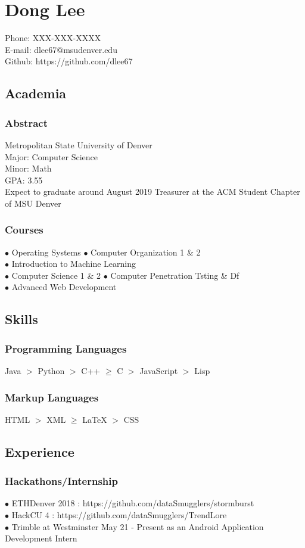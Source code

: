 \documentclass{article}
\begin{document}
\section{Dong Lee}
{\Large Phone: XXX-XXX-XXXX} \\
{\Large E-mail: dlee67@msudenver.edu} \\
{\Large Github: https://github.com/dlee67}
\subsection{Academia}
\subsubsection {Abstract}
{\Large Metropolitan State University of Denver} \\
{\Large Major: Computer Science} \\
{\Large Minor: Math} \\
{\Large GPA: 3.55} \\
{\Large Expect to graduate around August 2019}
{\Large Treasurer at the ACM Student Chapter of MSU Denver}
\subsubsection {Courses}
$\bullet$ {\Large Operating Systems} $\bullet$ {\Large Computer Organization 1 \& 2} \\ $\bullet$ {\Large Introduction to Machine Learning} \\
$\bullet$ {\Large Computer Science 1 \& 2} $\bullet$ {\Large Computer Penetration Tsting \& Df} \\ $\bullet$ {\Large Advanced Web Development}
\subsection{Skills}
\subsubsection{Programming Languages}
{\Large Java $>$ Python $>$ C++ $\geq$ C $>$ JavaScript $>$ Lisp}
\subsubsection{Markup Languages}
{\Large HTML $>$ XML $\geq$ {\LaTeX} $>$ CSS}
\subsection{Experience}
\subsubsection{Hackathons/Internship}
{\Large
$\bullet$ ETHDenver 2018 : https://github.com/dataSmugglers/stormburst \\
$\bullet$ HackCU 4 : https://github.com/dataSmugglers/TrendLore \\
$\bullet$ Trimble at Westminster May 21 - Present as an Android Application Development Intern
}
\end{document}
